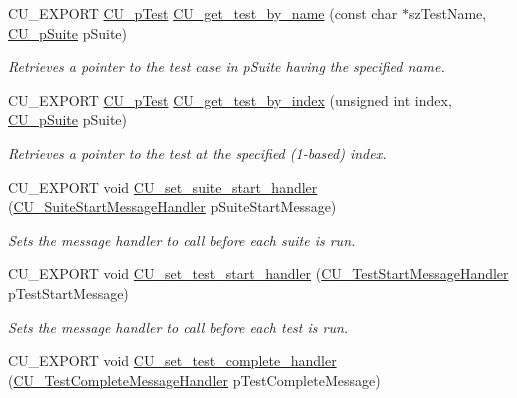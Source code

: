 \begin{DoxyCompactItemize}
C\-U\-\_\-\-E\-X\-P\-O\-R\-T \hyperlink{group__Framework_ga249c43fbe4e53452b3f90db1437da04b}{C\-U\-\_\-p\-Test} \hyperlink{group__Framework_gab627141bbc9dff09228530d289517e9c}{C\-U\-\_\-get\-\_\-test\-\_\-by\-\_\-name} (const char $\ast$sz\-Test\-Name, \hyperlink{group__Framework_gaba832ae8b235f5e70d6a4ac9c3bb1219}{C\-U\-\_\-p\-Suite} p\-Suite)
\begin{DoxyCompactList}\small\item\em Retrieves a pointer to the test case in p\-Suite having the specified name. \end{DoxyCompactList}\item 
C\-U\-\_\-\-E\-X\-P\-O\-R\-T \hyperlink{group__Framework_ga249c43fbe4e53452b3f90db1437da04b}{C\-U\-\_\-p\-Test} \hyperlink{group__Framework_gad12cd874661530cd3aa61d715be58dd6}{C\-U\-\_\-get\-\_\-test\-\_\-by\-\_\-index} (unsigned int index, \hyperlink{group__Framework_gaba832ae8b235f5e70d6a4ac9c3bb1219}{C\-U\-\_\-p\-Suite} p\-Suite)
\begin{DoxyCompactList}\small\item\em Retrieves a pointer to the test at the specified (1-\/based) index. \end{DoxyCompactList}\item 
C\-U\-\_\-\-E\-X\-P\-O\-R\-T void \hyperlink{group__Framework_ga1d9b994f4855362a026179d1ea6b1491}{C\-U\-\_\-set\-\_\-suite\-\_\-start\-\_\-handler} (\hyperlink{group__Framework_gab7f4df4360e8d2faa7e59571a1409448}{C\-U\-\_\-\-Suite\-Start\-Message\-Handler} p\-Suite\-Start\-Message)
\begin{DoxyCompactList}\small\item\em Sets the message handler to call before each suite is run. \end{DoxyCompactList}\item 
C\-U\-\_\-\-E\-X\-P\-O\-R\-T void \hyperlink{group__Framework_gae89d85d65b1eac85f9950485456748e5}{C\-U\-\_\-set\-\_\-test\-\_\-start\-\_\-handler} (\hyperlink{group__Framework_ga3330df7f5c95933f4ba21c648933c928}{C\-U\-\_\-\-Test\-Start\-Message\-Handler} p\-Test\-Start\-Message)
\begin{DoxyCompactList}\small\item\em Sets the message handler to call before each test is run. \end{DoxyCompactList}\item 
C\-U\-\_\-\-E\-X\-P\-O\-R\-T void \hyperlink{group__Framework_gaefb891b295a40078428f38084a186588}{C\-U\-\_\-set\-\_\-test\-\_\-complete\-\_\-handler} (\hyperlink{group__Framework_ga2c11da75531b097ca037223489bf02be}{C\-U\-\_\-\-Test\-Complete\-Message\-Handler} p\-Test\-Complete\-Message)

\end{DoxyCompactItemize}
